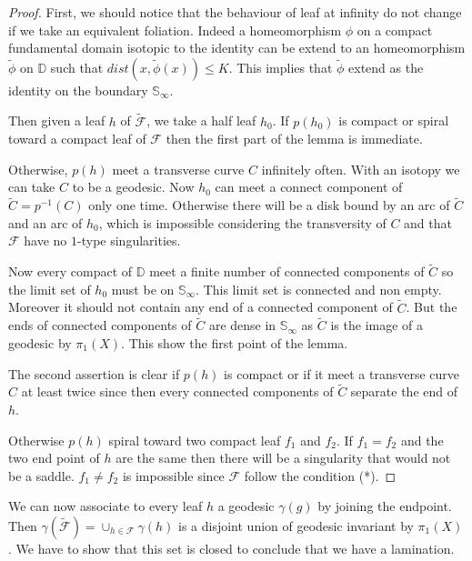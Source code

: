 \begin{proof}
First, we should notice that the behaviour of leaf at infinity do not change if we take an equivalent foliation. Indeed a homeomorphism $\phi$ on a compact fundamental domain isotopic to the identity can be extend to an homeomorphism $\tilde{\phi}$ on $\mathbb{D}$ such that $dist(x,\tilde{\phi}(x)) \leq K$. This implies that $\tilde{\phi}$ extend as the identity on the boundary $\mathbb{S}_{\infty}$.

\smallbreak
Then given a leaf $h$ of $\mathcal{\tilde{F}}$, we take a half leaf $h_0$. If $p(h_0)$ is compact or spiral toward a compact leaf of $\mathcal{F}$ then the first part of the lemma is immediate.

\smallbreak
Otherwise, $p(h)$ meet a transverse curve $C$ infinitely often. With an isotopy we can take $C$ to be a geodesic. Now $h_0$ can meet a connect component of $\tilde{C}=p^{-1}(C)$ only one time. Otherwise there will be a disk bound by an arc of $\tilde{C}$ and an arc of $h_0$, which is impossible considering the transversity of $C$ and that $\mathcal{F}$ have no $1$-type singularities.

\smallbreak
Now every compact of $\mathbb{D}$ meet a finite number of connected components of $\tilde{C}$ so the limit set of $h_0$ must be on $\mathbb{S}_{\infty}$. This limit set is connected and non empty. Moreover it should not contain any end of a connected component of $\tilde{C}$. But the ends of connected components of $\tilde{C}$ are dense in $\mathbb{S}_{\infty}$ as $\tilde{C}$ is the image of a geodesic by $\pi_1(X)$. This show the first point of the lemma.

\smallbreak
The second assertion is clear if $p(h)$ is compact or if it meet a transverse curve $C$ at least twice since then every connected components of $\tilde{C}$ separate the end of $h$.

\smallbreak
Otherwise $p(h)$ spiral toward two compact leaf $f_1$ and $f_2$. If $f_1=f_2$ and the two end point of $h$ are the same then there will be a singularity that would not be a saddle. $f_1 \neq f_2$ is impossible since $\mathcal{F}$ follow the condition (*).
\end{proof}

\smallbreak
We can now associate to every leaf $h$ a geodesic $\gamma(g)$ by joining the endpoint. Then $\gamma(\tilde{\mathcal{F}})= \cup_{h \in \mathcal{F}} \gamma(h)$ is a disjoint union of geodesic invariant by $\pi_1(X)$. We have to show that this set is closed to conclude that we have a lamination.

